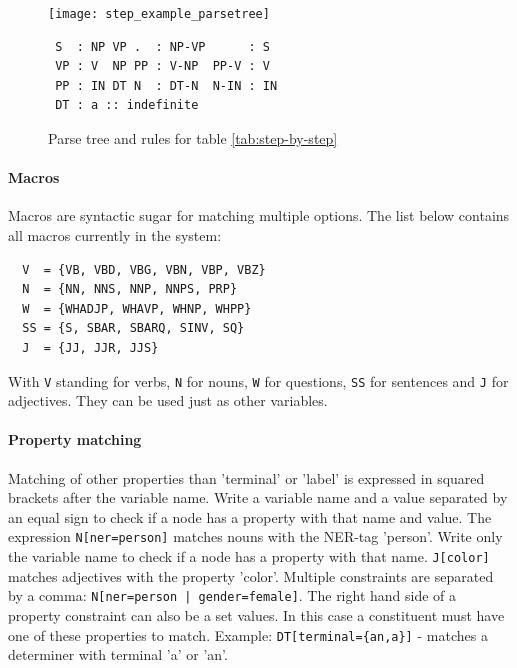 \documentclass[english]{article}
\begin{document}
\begin{figure}[H]
\centering
\texttt{[image: step\_example\_parsetree]}
\lstset{
  numbers=left,
  frame=tb,
  xleftmargin=.15\textwidth, xrightmargin=.15\textwidth
} 
\begin{lstlisting}
 S  : NP VP .  : NP-VP      : S
 VP : V  NP PP : V-NP  PP-V : V
 PP : IN DT N  : DT-N  N-IN : IN 
 DT : a :: indefinite
\end{lstlisting}
\caption{Parse tree and rules for table \ref{tab:step-by-step}}
\label{fig:step-by-step}
\end{figure}

\paragraph{Macros}{
  Macros are syntactic sugar for matching multiple options.  The list below contains all macros currently in the system:

  \begin{lstlisting}
  V  = {VB, VBD, VBG, VBN, VBP, VBZ}
  N  = {NN, NNS, NNP, NNPS, PRP}
  W  = {WHADJP, WHAVP, WHNP, WHPP}
  SS = {S, SBAR, SBARQ, SINV, SQ}
  J  = {JJ, JJR, JJS}
  \end{lstlisting}
  With \lstinline{V} standing for verbs, \lstinline{N} for nouns, \lstinline{W} for questions, \lstinline{SS} for sentences and \lstinline{J} for adjectives. They can be used just as other variables. 
}

\paragraph{Property matching}
Matching of other properties than 'terminal' or 'label' is expressed in squared brackets after the variable name. Write a variable name and a value separated by an equal sign to check if a node has a property with that name and value. The expression \lstinline{N[ner=person]} matches nouns with the NER-tag 'person'. Write only the variable name to check if a node has a property with that name. \lstinline{J[color]} matches adjectives with the property 'color'. Multiple constraints are separated by a comma: \lstinline{N[ner=person | gender=female]}.
The right hand side of a property constraint can also be a set values. In this case a constituent must have one of these properties to match. Example: \lstinline|DT[terminal={an,a}]| - matches a determiner with terminal 'a' or 'an'.
\end{document}
